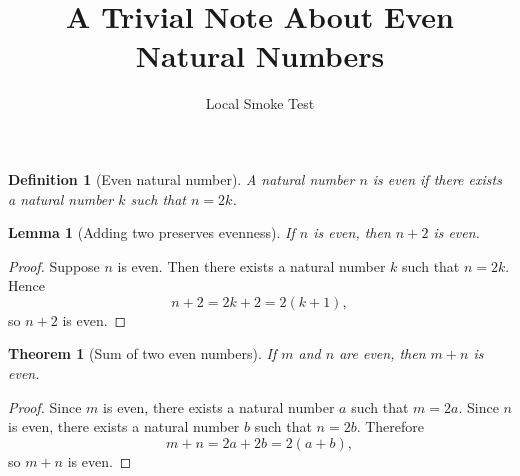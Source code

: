 \documentclass{article}
\title{A Trivial Note About Even Natural Numbers}
\author{Local Smoke Test}
\date{}
\newtheorem{definition}{Definition}
\newtheorem{lemma}{Lemma}
\newtheorem{theorem}{Theorem}
\begin{document}
\maketitle

\begin{definition}[Even natural number]
\label{def:even}
A natural number $n$ is even if there exists a natural number $k$ such that $n = 2k$.
\end{definition}

\begin{lemma}[Adding two preserves evenness]
\label{lem:plus-two}
If $n$ is even, then $n + 2$ is even.
\end{lemma}

\begin{proof}
Suppose $n$ is even. Then there exists a natural number $k$ such that $n = 2k$.
Hence
\[
n + 2 = 2k + 2 = 2(k+1),
\]
so $n + 2$ is even.
\end{proof}

\begin{theorem}[Sum of two even numbers]
\label{thm:sum-even}
If $m$ and $n$ are even, then $m+n$ is even.
\end{theorem}

\begin{proof}
Since $m$ is even, there exists a natural number $a$ such that $m = 2a$.
Since $n$ is even, there exists a natural number $b$ such that $n = 2b$.
Therefore
\[
m+n = 2a + 2b = 2(a+b),
\]
so $m+n$ is even.
\end{proof}
\end{document}
